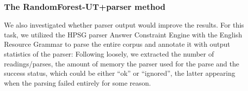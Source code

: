 \documentclass[a4paper,10pt]{scrartcl}
\theoremstyle{style}
\begin{document}














\subsubsection{The RandomForest-UT+parser method}
We also investigated whether parser output would improve the results. For this task, we utilized the HPSG parser Answer Constraint Engine \citep{ace} with the English Resource Grammar \citep{copestake2002implementing} to parse the entire corpus and annotate it with output statistics of the parser: Following \cite{wagner2007comparative} loosely, we extracted the number of readings/parses, the amount of memory the parser used for the parse and the success status, which could be either ``ok'' or ``ignored'', the latter appearing when the parsing failed entirely for some reason.
\end{document}
